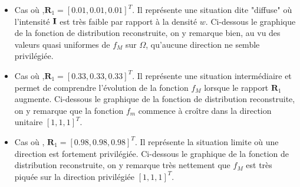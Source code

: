 \begin{itemize}

\item Cas  où ,$\mathbf{R}_1 = [ 0.01, 0.01, 0.01]^T$. Il représente une situation dite "diffuse" où l'intensité $\mathbf{I}$ est très faible par rapport à la densité $w$. Ci-dessous le graphique de la fonction de distribution reconstruite, on y remarque bien, au vu des valeurs quasi uniformes de $f_M$ sur $\Omega$, qu'aucune direction ne semble privilégiée. \\

\begin{center}
\end{center}


\item Cas  où ,$\mathbf{R}_1 = [ 0.33, 0.33, 0.33]^T$. Il représente une situation intermédiaire et permet de comprendre l'évolution de la fonction $f_M$ lorsque le rapport $\mathbf{R}_1$ augmente. Ci-dessous le graphique de la fonction de distribution reconstruite, on y remarque que la fonction $f_m$ commence à croître dans la direction unitaire $[1,1,1]^T$.\\

\begin{center}
\end{center}


\item Cas  où , $\mathbf{R}_1 = [ 0.98, 0.98, 0.98]^T$. Il représente la situation limite où une direction est fortement privilégiée.  Ci-dessous le graphique de la fonction de distribution reconstruite,  on y remarque très nettement que $f_M$ est très piquée sur la direction privilégiée $[1,1,1]^T$. \\


\begin{center}
\end{center}

\end{itemize}


